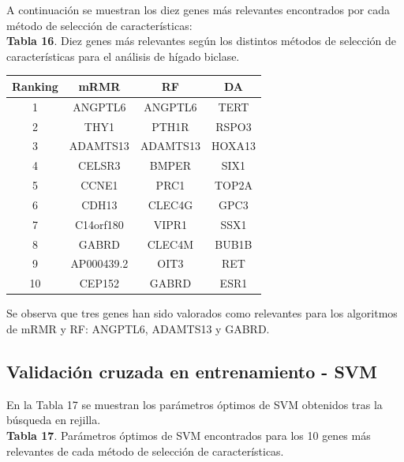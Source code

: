 A continuación se muestran los diez genes más relevantes encontrados por cada método de selección de características:\\

\textbf{Tabla 16}. Diez genes más relevantes según los distintos métodos de selección de características para el análisis de hígado biclase.

\begin{table}[H]
	\centering
	\begin{tabular}{cccc}
		\hline
		\textbf{Ranking} & \textbf{mRMR} & \textbf{RF} & \textbf{DA} \\ \hline
		1                & ANGPTL6       & ANGPTL6     & TERT        \\
		2                & THY1          & PTH1R       & RSPO3       \\
		3                & ADAMTS13      & ADAMTS13    & HOXA13      \\
		4                & CELSR3        & BMPER       & SIX1        \\
		5                & CCNE1         & PRC1        & TOP2A       \\
		6                & CDH13         & CLEC4G      & GPC3        \\
		7                & C14orf180     & VIPR1       & SSX1        \\
		8                & GABRD         & CLEC4M      & BUB1B       \\
		9                & AP000439.2    & OIT3        & RET         \\
		10               & CEP152        & GABRD       & ESR1        \\ \hline
	\end{tabular}
\end{table}

Se observa que tres genes han sido valorados como relevantes para los algoritmos de mRMR y RF:  ANGPTL6, ADAMTS13 y GABRD.

\subsection{Validación cruzada en entrenamiento - SVM}

En la Tabla 17 se muestran los parámetros óptimos de SVM obtenidos tras la búsqueda en rejilla.\\

\textbf{Tabla 17}. Parámetros óptimos de SVM encontrados para los 10 genes más relevantes de cada método de selección de características.

